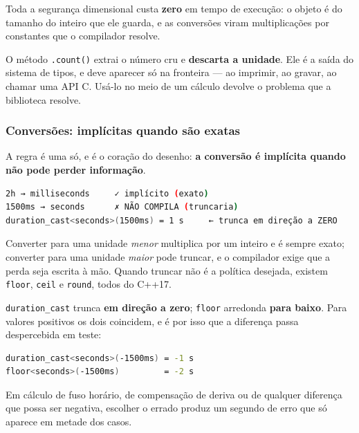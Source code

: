 Toda a segurança dimensional custa \textbf{zero} em tempo de execução: o objeto
é do tamanho do inteiro que ele guarda, e as conversões viram multiplicações
por constantes que o compilador resolve.

O método \texttt{.count()} extrai o número cru e \textbf{descarta a unidade}. Ele
é a saída do sistema de tipos, e deve aparecer só na fronteira --- ao imprimir,
ao gravar, ao chamar uma API C. Usá-lo no meio de um cálculo devolve o problema
que a biblioteca resolve.

\subsubsection{Conversões: implícitas quando são exatas}

A regra é uma só, e é o coração do desenho: \textbf{a conversão é implícita
quando não pode perder informação}.

\begin{lstlisting}[style=bt, language=bash,
    caption={Saída de \texttt{src/chrono/}: o que o compilador aceita e o que
             recusa.}]
2h → milliseconds     ✓ implícito (exato)
1500ms → seconds      ✗ NÃO COMPILA (truncaria)
duration_cast<seconds>(1500ms) = 1 s     ← trunca em direção a ZERO
\end{lstlisting}

Converter para uma unidade \emph{menor} multiplica por um inteiro e é sempre
exato; converter para uma unidade \emph{maior} pode truncar, e o compilador
exige que a perda seja escrita à mão. Quando truncar não é a política desejada,
existem \texttt{floor}, \texttt{ceil} e \texttt{round}, todos do C++17.

\begin{armadilha}
\texttt{duration\_cast} trunca \textbf{em direção a zero};
\texttt{floor} arredonda \textbf{para baixo}. Para valores positivos os dois
coincidem, e é por isso que a diferença passa despercebida em teste:
\begin{lstlisting}[style=bt, language=bash, frame=none,
                   xleftmargin=0pt, xrightmargin=0pt]
duration_cast<seconds>(-1500ms) = -1 s
floor<seconds>(-1500ms)         = -2 s
\end{lstlisting}
Em cálculo de fuso horário, de compensação de deriva ou de qualquer diferença
que possa ser negativa, escolher o errado produz um segundo de erro que só
aparece em metade dos casos.
\end{armadilha}

